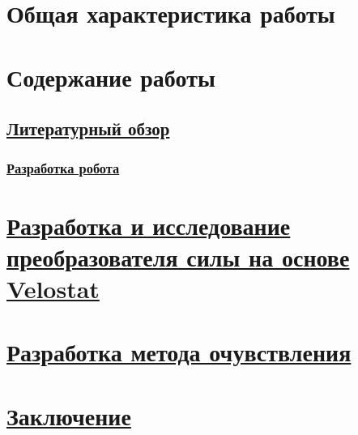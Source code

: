 \section*{Общая характеристика работы}





\section*{Содержание работы}
\subsection*{\underline{Литературный обзор}}

\subsubsection*{\underline{Разработка робота}}

\section*{\underline{Разработка и исследование преобразователя силы на основе Velostat}}

\section*{\underline{Разработка метода очувствления}}

\section*{\underline{Заключение}}


\nocite{*}
\insertbiblioauthorgroupedSynopsis

